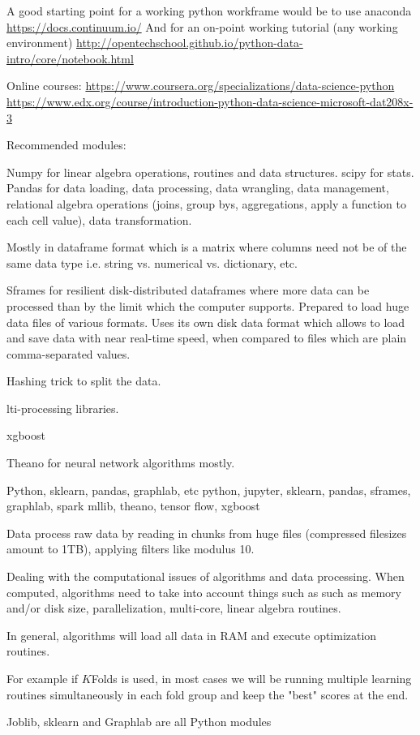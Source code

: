 \documentclass{article}%
\theoremstyle{definition}
\begin{document}
A good starting point for a working python workframe would be to use anaconda 
\url{https://docs.continuum.io/}
And for an on-point working tutorial (any working environment)
\url{http://opentechschool.github.io/python-data-intro/core/notebook.html}



Online courses:
\url{https://www.coursera.org/specializations/data-science-python}
\url{https://www.edx.org/course/introduction-python-data-science-microsoft-dat208x-3} 




Recommended modules:

Numpy for linear algebra operations, routines and data structures.
scipy for stats.
Pandas for data loading, data processing, data wrangling, data management, relational algebra  operations (joins, group bys, aggregations, apply a function to each cell value), data transformation. 

Mostly in dataframe format which is a matrix where columns need not be of the same data type i.e. string vs. numerical vs. dictionary, etc.

Sframes for resilient disk-distributed dataframes where more data can be processed than by the limit which the computer supports. Prepared to load huge data files of various formats. Uses its own disk data format which allows to load and save data with near real-time speed, when compared to files which are plain comma-separated values.

Hashing trick to split the data.


lti-processing libraries.

xgboost

Theano for neural network algorithms mostly.


Python, sklearn, pandas, graphlab, etc
python, jupyter, sklearn, pandas, sframes, graphlab, spark mllib, theano, tensor flow, xgboost

Data process raw data by reading in chunks from huge files (compressed filesizes amount to 1TB), applying filters like modulus 10.

Dealing with the computational issues of algorithms and data processing. When computed, algorithms need to take into account things such as such as memory and/or disk size, parallelization, multi-core, linear algebra routines.

In general, algorithms will load all data in RAM and execute optimization routines. 

For example if $K$Folds is used, in most cases we will be running multiple  learning routines simultaneously in each fold group and keep the "best" scores at the end.

Joblib, sklearn and Graphlab are all Python modules
\end{document}
